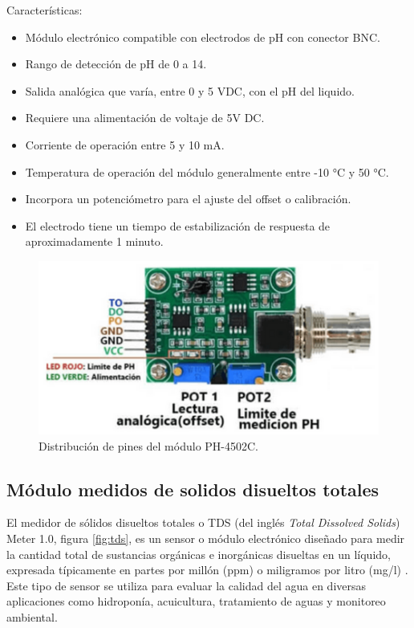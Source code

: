 Características:

\begin{itemize}
	\item Módulo electrónico compatible con electrodos de pH con conector BNC.
	\item Rango de detección de pH de 0 a 14.
	\item Salida analógica que varía, entre 0 y 5 VDC, con el pH del liquido.
	\item Requiere una alimentación de voltaje de 5V DC.
	\item Corriente de operación entre 5 y 10 mA.
	\item Temperatura de operación del módulo generalmente entre -10 °C y 50 °C.
	\item Incorpora un potenciómetro para el ajuste del offset o calibración.
	\item El electrodo tiene un tiempo de estabilización de respuesta de aproximadamente 1 minuto.
\end{itemize}

\begin{figure}[h]
\centering
\includegraphics[scale=.5]{./Figures/ph.png}
	\caption{Distribución de pines del módulo PH-4502C.}
	\label{fig:ph}
\end{figure}


\subsection{Módulo medidos de solidos disueltos totales}

El medidor de sólidos disueltos totales o TDS (del inglés \textit{Total Dissolved Solids}) Meter 1.0, figura \ref{fig:tds}, es un sensor o módulo electrónico diseñado para medir la cantidad total de sustancias orgánicas e inorgánicas disueltas en un líquido, expresada típicamente en partes por millón (ppm) o miligramos por litro (mg/l) \cite{TDS}. Este tipo de sensor se utiliza para evaluar la calidad del agua en diversas aplicaciones como hidroponía, acuicultura, tratamiento de aguas y monitoreo ambiental.


